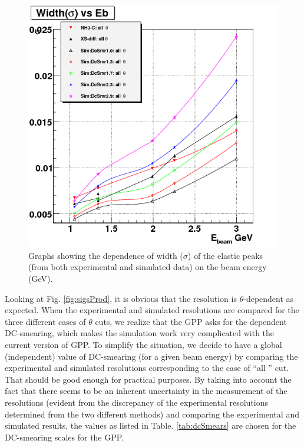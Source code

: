  \begin{figure}[h] %
\centering
  \leavevmode \includegraphics[width=1.0\textwidth]{figuresEG4/DcSmear/graphSigmaVsEb_SimThAll.png} 
  \caption[$E_{beam}$ dependence of DC smearing (Experimental) ]{Graphs showing the dependence of width ($\sigma$) of the elastic peaks (from both experimental and simulated data) on the beam energy (GeV).}
  \label{fig:sigsProdSim}
\end{figure}
    
     
     
Looking at Fig. \ref{fig:sigsProd}, it is obvious that the resolution is $\theta$-dependent as expected. %
When the experimental and simulated resolutions are compared for the three different cases of $\theta$ cuts, we realize that the GPP asks for the 
\th dependent DC-smearing, which makes the simulation work very complicated with the current version of GPP. To simplify the situation, we decide to 
have a global (\th independent) value of DC-smearing (for a given beam energy) by comparing the experimental and simulated resolutions corresponding to 
the case of ``all \th'' cut. That should be good enough for %
practical purposes. By taking into account the fact that there seems to be an inherent 
uncertainty in the measurement of the resolutions (evident from the discrepancy of the experimental resolutions determined from the two different methods)
and comparing the experimental and simulated results, the values as listed in Table. \ref{tab:dcSmears} are chosen for the DC-smearing scales for the GPP.



